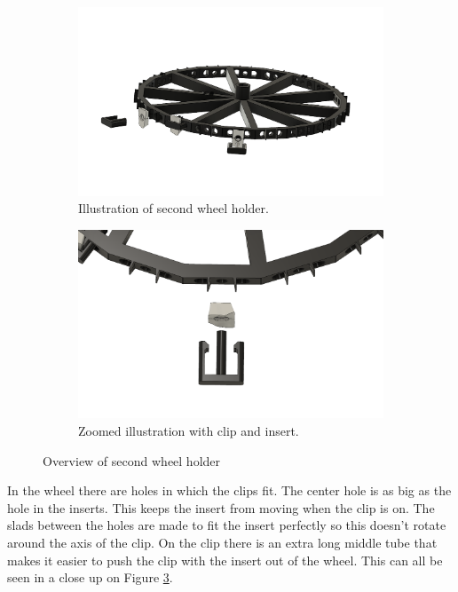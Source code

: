 		
		\begin{figure}[hbtp]
		\centering
		\begin{subfigure}{0.49\textwidth}
			\includegraphics[width=\linewidth]{fig/Camera_setup/Tool_Holder/Wheel_Holder/Second_Wheel_Holder/radhouder_v2_assembly v3 extra insert.png}
			\caption{Illustration of second wheel holder.}
			\label{fig:setup:wheelholder2:inserts}
		\end{subfigure}
		\hspace*{\fill}
		\begin{subfigure}{0.49\textwidth}
			\includegraphics[width=\linewidth]{fig/Camera_setup/Tool_Holder/Wheel_Holder/Second_Wheel_Holder/radhouder_v2_assembly v3 top view insert.png}
			\caption{Zoomed illustration with clip and insert.}
			\label{fig:setup:wheelholder2:topinserts}
		\end{subfigure}
		\caption{Overview of second wheel holder}
		\end{figure}
		
		In the wheel there are holes in which the clips fit. The center hole is as big as the hole in the inserts. This keeps the insert from moving when the clip is on. The slads between the holes are made to fit the insert perfectly so this doesn't rotate around the axis of the clip. On the clip there is an extra long middle tube that makes it easier to push the clip with the insert out of the wheel. This can all be seen in a close up on Figure \ref{fig:setup:wheelholder2:topinserts}.
		

